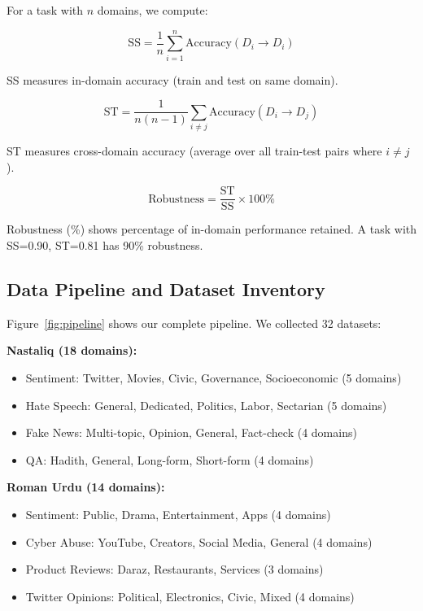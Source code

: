 \documentclass[10pt,twocolumn,journal]{IEEEtran}
\begin{document}
For a task with $n$ domains, we compute:

\begin{equation}
\text{SS} = \frac{1}{n} \sum_{i=1}^{n} \text{Accuracy}(D_i \to D_i)
\end{equation}

\noindent SS measures in-domain accuracy (train and test on same domain).

\begin{equation}
\text{ST} = \frac{1}{n(n-1)} \sum_{i \neq j} \text{Accuracy}(D_i \to D_j)
\end{equation}

\noindent ST measures cross-domain accuracy (average over all train-test pairs where $i \neq j$).

\begin{equation}
\text{Robustness} = \frac{\text{ST}}{\text{SS}} \times 100\%
\end{equation}

\noindent Robustness (\%) shows percentage of in-domain performance retained. A task with SS=0.90, ST=0.81 has 90\% robustness.

\subsection{Data Pipeline and Dataset Inventory}

Figure~\ref{fig:pipeline} shows our complete pipeline. We collected 32 datasets:

\textbf{Nastaliq (18 domains):}
\begin{itemize}
\item Sentiment: Twitter, Movies, Civic, Governance, Socioeconomic (5 domains)
\item Hate Speech: General, Dedicated, Politics, Labor, Sectarian (5 domains)
\item Fake News: Multi-topic, Opinion, General, Fact-check (4 domains)
\item QA: Hadith, General, Long-form, Short-form (4 domains)
\end{itemize}

\textbf{Roman Urdu (14 domains):}
\begin{itemize}
\item Sentiment: Public, Drama, Entertainment, Apps (4 domains)
\item Cyber Abuse: YouTube, Creators, Social Media, General (4 domains)
\item Product Reviews: Daraz, Restaurants, Services (3 domains)
\item Twitter Opinions: Political, Electronics, Civic, Mixed (4 domains)
\end{itemize}
\end{document}
